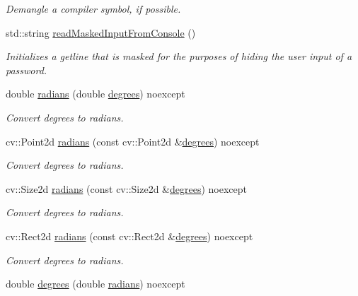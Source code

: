 \begin{DoxyCompactItemize}
\begin{DoxyCompactList}\small\item\em Demangle a compiler symbol, if possible. \end{DoxyCompactList}\item 
std\+::string \hyperlink{group___utility_module_ga3d0cf89b2a18e61bc8c07ae4006c9744}{read\+Masked\+Input\+From\+Console} ()
\begin{DoxyCompactList}\small\item\em Initializes a getline that is masked for the purposes of hiding the user input of a password. \end{DoxyCompactList}\item 
double \hyperlink{group___utility_module_ga547c4f80c778878854c572c297cc1983}{radians} (double \hyperlink{group___utility_module_gac74d2fa0aeac8bd310ed61663a153e84}{degrees}) noexcept
\begin{DoxyCompactList}\small\item\em Convert degrees to radians. \end{DoxyCompactList}\item 
cv\+::\+Point2d \hyperlink{group___utility_module_ga8ce4d2c11e35fe075404a256c272b4d8}{radians} (const cv\+::\+Point2d \&\hyperlink{group___utility_module_gac74d2fa0aeac8bd310ed61663a153e84}{degrees}) noexcept
\begin{DoxyCompactList}\small\item\em Convert degrees to radians. \end{DoxyCompactList}\item 
cv\+::\+Size2d \hyperlink{group___utility_module_gabf4e708fbdf32c6c93035b918d7ffa03}{radians} (const cv\+::\+Size2d \&\hyperlink{group___utility_module_gac74d2fa0aeac8bd310ed61663a153e84}{degrees}) noexcept
\begin{DoxyCompactList}\small\item\em Convert degrees to radians. \end{DoxyCompactList}\item 
cv\+::\+Rect2d \hyperlink{group___utility_module_ga7712032c74d8bc4e9c392964d4e18e8c}{radians} (const cv\+::\+Rect2d \&\hyperlink{group___utility_module_gac74d2fa0aeac8bd310ed61663a153e84}{degrees}) noexcept
\begin{DoxyCompactList}\small\item\em Convert degrees to radians. \end{DoxyCompactList}\item 
double \hyperlink{group___utility_module_gac74d2fa0aeac8bd310ed61663a153e84}{degrees} (double \hyperlink{group___utility_module_ga547c4f80c778878854c572c297cc1983}{radians}) noexcept

\end{DoxyCompactItemize}
